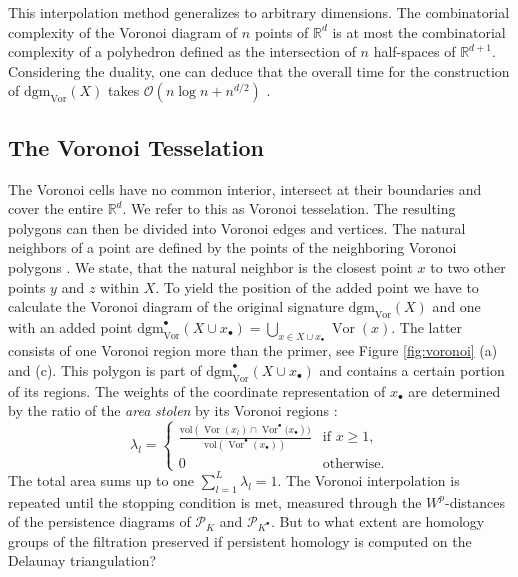 \documentclass{article}
\DeclareMathOperator{\Vor}{\text{Vor}}
\begin{document}
This interpolation method generalizes to arbitrary dimensions. The combinatorial complexity of the Voronoi diagram of $n$ points of $\mathbb{R}^d$ is at most the combinatorial complexity of a polyhedron defined as the intersection of $n$ half-spaces of $\mathbb{R}^{d+1}$. Considering the duality, one can deduce that the overall time for the construction of $\text{dgm}_{\Vor}(X)$ takes $\mathcal{O}( n \log n+n^{d/2})$  \cite{BoissonnatDG18}.

\subsection{The Voronoi Tesselation}
The Voronoi cells have no common interior, intersect at their boundaries and cover the entire $\mathbb{R}^d$. We refer to this as Voronoi tesselation. The resulting polygons can then be divided into Voronoi edges and vertices. The natural neighbors of a point are defined by the points of the neighboring Voronoi polygons \cite{Sibson}. We state, that the natural neighbor is the closest point $x$ to two other points $y$ and $z$ within $X$. To yield the position of the added point we have to calculate the Voronoi diagram of the original signature $\text{dgm}_{\Vor}(X)$ and one with an added point $\text{dgm}_{\Vor}^{\bullet}(X\cup x_{\bullet}) = \bigcup_{x \in X \cup x_\bullet} \Vor(x)$. The latter consists of one Voronoi region more than the primer, see Figure \ref{fig:voronoi} (a) and (c). This polygon is part of $\text{dgm}_{\Vor}^{\bullet}(X\cup x_{\bullet})$ and contains a certain portion of its regions. The weights of the coordinate representation of $x_{\bullet}$ are determined by the ratio of the \textit{area} \textit{stolen} by its Voronoi regions \cite{Anton2001}:
\begin{equation}
    \lambda_{l} =
    \begin{cases}
        \frac{\text{vol}\left(\Vor(x_l) \cap \Vor^{\bullet}(x_{\bullet}\right))}{\text{vol}\left(\Vor^{\bullet}(x_{\bullet})\right)} & \text{if } x\geq 1,\\
        0 & \text{otherwise.}
    \end{cases}
\end{equation}
The total area sums up to one $\sum_{l=1}^{L} \lambda_l = 1$. The Voronoi interpolation is repeated until the stopping condition is met, measured through the $W^p$-distances of the persistence diagrams of $\mathcal{P}_{K}$ and $\mathcal{P}_{K^\bullet}$. But to what extent are homology groups of the filtration preserved if persistent homology is computed on the Delaunay triangulation?
\end{document}
